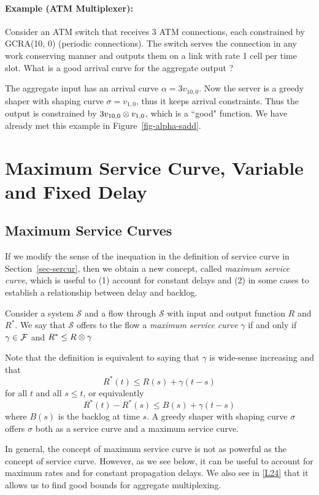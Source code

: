 \paragraph{Example (ATM Multiplexer): } Consider an ATM
switch that receives 3 ATM connections, each constrained by
GCRA(10, 0) (periodic connections). The switch serves the
connection in any work conserving manner and outputs them on a
link with rate 1 cell per time slot. What is a good arrival curve
for the aggregate output ?

The aggregate input has an arrival curve $\alpha=3 v_{10,0}$. Now
the server is a greedy shaper with shaping curve $\sigma=v_{1,0}$,
thus it keeps arrival constraints. Thus the output is constrained
by $3 v_{10,0} \otimes v_{1,0}$, which is a ``good" function. We have
already met this example in Figure~\ref{fig-alpha-sadd}.

\section{Maximum Service Curve, Variable and Fixed Delay}

\subsection{Maximum Service Curves}

If we modify the sense of the inequation in the definition of
service curve in Section~\ref{sec-sercur}, then we obtain a new
concept, called \emph{maximum service curve}, which is useful to
(1) account for constant delays and (2) in some cases to establish
a relationship between delay and backlog.
\begin{definition}
 Consider a  system $\mathcal{S}$ and a flow
through $\mathcal{S}$ with input and output function $R$ and
$R^{*}$. We say that $\mathcal{S}$ offers to the flow a
\emph{maximum service curve} $\gamma$ if and only if $\gamma \in
\mathcal F$ and $R^{*} \leq R \otimes \gamma$
\end{definition}
Note that the definition is equivalent to saying that $\gamma$ is
wide-sense increasing and that
 $$R^*(t) \leq R(s) + \gamma(t-s)
 $$
for all $t$ and all $s \leq t$, or equivalently
 $$R^*(t)-R^*(s) \leq B(s) + \gamma(t-s) $$
 where $B(s)$ is the backlog at time $s$.
A greedy shaper with shaping curve $\sigma$ offers $\sigma$ both
as a service curve and a maximum service curve.

In general, the concept of maximum service curve is not as
powerful as the concept of service curve. However, as we see
below, it can be useful to account for maximum rates and for
constant propagation delays. We also see in \cref{L24} that it
allows us to find good bounds for aggregate multiplexing.

